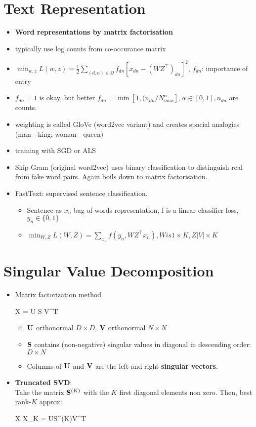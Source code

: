 \section{Text Representation}
\begin{itemize}
	\item \textbf{Word representations by matrix factorisation}
	\item typically use log counts from co-occurance matrix
	\item $\min_{w,z} L(w,z) = \frac{1}{2} \sum_{(d,n)\in\Omega} f_{dn} [x_{dn} - (WZ^\top)_{dn}]^2$, $f_{dn}$: importance of entry
	\item $f_{dn} = 1$ is okay, but better $f_{dn} = \min[1, (n_{dn}/N_{max}^\alpha], \alpha \in [0,1], n_{dn}$ are counts.
	\item weighting is called GloVe (word2vec variant) and creates spacial analogies (man - king; woman - queen)
	\item training with SGD or ALS
	\item Skip-Gram (original word2vec) uses binary classification to distinguish real from fake word pairs. Again boils down to matrix factorisation.
	\item FastText: supervised sentence classification.
	\begin{itemize}
		\item Sentence as $x_n$ bag-of-words representation, f is a linear classifier loss, $y_n \in \{0,1\}$
		\item $\min_{W,Z} L(W,Z) = \sum_{x_n} f(y_n, WZ^\top x_n), W is 1 \times K, Z \vert V \vert \times K$ 
	\end{itemize}
\end{itemize}

\section{Singular Value Decomposition}
\begin{itemize}
	\item Matrix factorization method
	\begin{myalign*}
	    \*X = \*U \*S \*V^T
	\end{myalign*}
	\begin{itemize}
		\item $\mathbf{U}$ orthonormal $D \times D$, $\mathbf{V}$ orthonormal $N \times N$
		\item $\mathbf{S}$ contains (non-negative) singular values in diagonal in descending order: $D \times N$
		\item Columns of $\mathbf{U}$ and $\mathbf{V}$ are the left and right \textbf{singular vectors}.
	\end{itemize}
	\item {\bf Truncated SVD}: \\
	Take the matrix $\mathbf{S}^{(K)}$ with the $K$ first diagonal elements non zero. Then, best rank-$K$ approx:	
	\begin{myalign*}
		\*X \approx \*X_K = \*U\*S^{(K)}\*V^T
	\end{myalign*}
	
\end{itemize}

